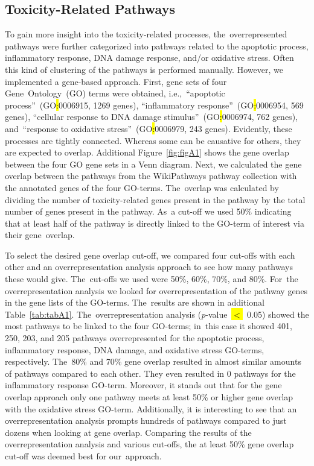 \documentclass[ijms,article,accept,moreauthors,pdftex]{Definitions/mdpi}
\begin{document}
\begin{paracol}{2}
\subsection{Toxicity-Related Pathways}
To gain more insight into the toxicity-related processes, the~overrepresented pathways were further categorized into pathways related to the apoptotic process, inflammatory response, DNA damage response, and/or oxidative stress. Often this kind of clustering of the pathways is performed manually. However, we implemented a gene-based approach. First, gene sets of four Gene~Ontology~(GO) terms were obtained, i.e.,~“apoptotic process”~(GO\hl{:}0006915, %
1269 genes), “inflammatory response”~(GO\hl{:}0006954, 569 genes),  “cellular response to DNA damage stimulus”~(GO\hl{:}0006974, 762 genes), and~“response to oxidative stress”~(GO\hl{:}0006979, 243 genes). Evidently, these processes are tightly connected. Whereas some can be causative for others, they are expected to overlap. Additional Figure~\ref{fig:figA1} shows the gene overlap between the four GO gene sets in a Venn diagram. Next, we calculated the gene overlap between the pathways from the WikiPathways pathway collection with the annotated genes of the four GO-terms. The~overlap was calculated by dividing the number of toxicity-related genes present in the pathway by the total number of genes present in the pathway. As~a cut-off we used 50$\%$ indicating that at least half of the pathway is directly linked to the GO-term of interest via their gene~overlap.

To select the desired gene overlap cut-off, we compared four cut-offs with each other and an overrepresentation analysis approach to see how many pathways these would give. The~cut-offs we used were 50\%, 60\%, 70\%, and 80\%. For~the overrepresentation analysis we looked for overrepresentation of the pathway genes in the gene lists of the GO-terms. The~results are shown in additional Table~\ref{tab:tabA1}. The~overrepresentation analysis \mbox{(\emph{p}-value~\hl{$<$}~0.05)} %
showed the most pathways to be linked to the four GO-terms; in~this case it showed 401, 250, 203, and 205 pathways overrepresented for the apoptotic process, inflammatory response, DNA damage, and oxidative stress GO-terms, respectively. The~80\% and 70\% gene overlap resulted in almost similar amounts of pathways compared to each other. They even resulted in 0 pathways for the inflammatory response GO-term. Moreover, it stands out that for the gene overlap approach only one pathway meets at least 50\% or higher gene overlap with the oxidative stress GO-term. Additionally, it is interesting to see that an overrepresentation analysis prompts hundreds of pathways compared to just dozens when looking at gene overlap. Comparing the results of the overrepresentation analysis and various cut-offs, the at least 50\% gene overlap cut-off was deemed best for our~approach. 


\end{paracol}
\end{document}
